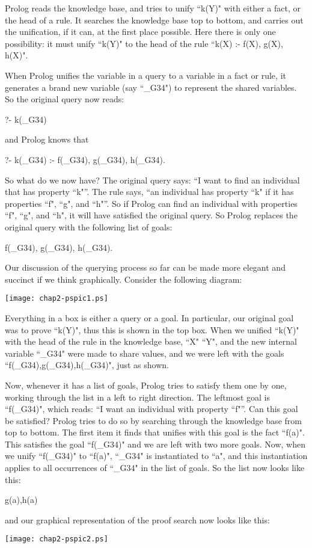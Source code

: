 Prolog reads the knowledge base, and tries to unify ``k(Y)" with either
a fact, or the head of a rule. It searches the knowledge base top to
bottom, and carries out the unification, if it can, at the first place
possible. Here there is only one possibility: it must unify ``k(Y)" to
the head of the rule ``k(X) :- f(X), g(X), h(X)".

When Prolog unifies the variable in a query to a variable in a fact or
rule, it generates a brand new variable
(say ``\_G34")
to represent the shared
variables. So the original query now reads:
\begin{LPNcodedisplay}
?- k(_G34)
\end{LPNcodedisplay}
%
and Prolog knows that
\begin{LPNcodedisplay}
?- k(_G34) :- f(_G34), g(_G34), h(_G34).
\end{LPNcodedisplay}


So what do we now have? The original query says: ``I want to find an
individual that has property ``k"''. The rule says, ``an individual has
property ``k" if it has properties ``f", ``g", and ``h"''. So if Prolog
can find an individual with properties ``f", ``g", and ``h", it will have
satisfied the original query. So Prolog replaces the original query
with the following list of goals:
\begin{LPNcodedisplay}
f(_G34), g(_G34), h(_G34).
\end{LPNcodedisplay}

Our discussion of the querying process so far can be made more elegant
and succinct if we think graphically. Consider the following diagram:
%
\begin{center}
\texttt{[image: chap2-pspic1.ps]}
\end{center}
%
Everything in a box is either a query or a goal.  In particular, our
original goal was to prove ``k(Y)", thus this is shown in the top box.
When we unified ``k(Y)" with the head of the rule in the knowledge
base, ``X" ``Y", and the new internal variable ``\_G34" were made to share
values, and we were left with the goals ``f(\_G34),g(\_G34),h(\_G34)",
just as shown.

Now, whenever it has a list of goals, Prolog tries to satisfy them one
by one, working through the list in a left to right direction. The
leftmost goal is ``f(\_G34)", which reads: ``I want an individual with
property ``f"''. Can this goal be satisfied? Prolog tries to do so by
searching through the knowledge base from top to bottom.  The first
item it finds that unifies with this goal is the fact ``f(a)". This
satisfies the goal ``f(\_G34)" and we are left with two more goals.
Now, when we unify ``f(\_G34)" to ``f(a)", ``\_G34" is instantiated to ``a",
and this instantiation applies to all occurrences of ``\_G34" in the
list of goals. So the list now looks like this:
\begin{LPNcodedisplay}
g(a),h(a)
\end{LPNcodedisplay}
%
and our graphical representation of the proof search now looks like this:
%
\begin{center}
\texttt{[image: chap2-pspic2.ps]}
\end{center}
%

